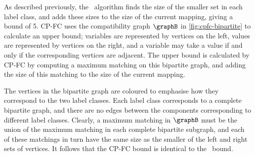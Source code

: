 As described previously, the \McSplit\ algorithm finds the size of the smaller
set in each label class, and adds these sizes to the size of the current
mapping, giving a bound of 5.  CP-FC uses the compatibility graph $\graphB$ in
\cref{fig:cpfc-bipartite} to calculate an upper bound; variables are
represented by vertices on the left, values are represented by vertices on the
right, and a variable may take a value if and only if the corresponding
vertices are adjacent.  The upper bound is calculated by CP-FC by computing a
maximum matching on this bipartite graph, and adding the size of this matching
to the size of the current mapping.

The vertices in the bipartite graph are coloured to emphasise how they
correspond to the two label classes.  Each label class corresponds to a
complete bipartite graph, and there are no edges between the components
corresponding to different label classes.  Clearly, a maximum matching in
$\graphB$ must be the union of the maximum matching in each complete bipartite
subgraph, and each of these matchings in turn have the same size as the smaller
of the left and right sets of vertices.  It follows that the CP-FC bound is
identical to the \McSplit\ bound.

